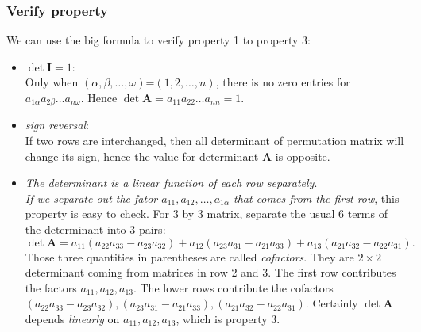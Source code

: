 \subsubsection{Verify property}
We can use the big formula to verify property 1 to property 3:
\begin{itemize}
\item $\det\bm I=1$:\\
Only when $(\alpha,\beta,\dots,\omega)$=$(1,2,\dots,n)$, there is no zero entries for $a_{1\alpha}a_{2\beta}\dots a_{n\omega}$. Hence $\det\bm A=a_{11}a_{22}\dots a_{nn}=1$.
\item \emph{sign reversal}:\\
If two rows are interchanged, then all determinant of permutation matrix will change its sign, hence the value for determinant $\bm A$ is opposite.
\item \emph{The determinant is a linear function of each row separately}.\\
\emph{If we separate out the fator $a_{11},a_{12},\dots,a_{1\alpha}$ that comes from the first row}, this property is easy to check. For 3 by 3 matrix, separate the usual 6 terms of the determinant into 3 pairs:
\[
\det\bm A=a_{11}(a_{22}a_{33}-a_{23}a_{32})+a_{12}(a_{23}a_{31}-a_{21}a_{33})+a_{13}(a_{21}a_{32}-a_{22}a_{31}).
\]
Those three quantities in parentheses are called \emph{cofactors}. They are $2\times 2$ determinant coming from matrices in row 2 and 3. The first row contributes the factors $a_{11},a_{12},a_{13}$. The lower rows contribute the cofactors $(a_{22}a_{33}-a_{23}a_{32}),(a_{23}a_{31}-a_{21}a_{33}),(a_{21}a_{32}-a_{22}a_{31})$. Certainly $\det\bm A$ depends \emph{linearly} on $a_{11},a_{12},a_{13}$, which is property 3.
\end{itemize}
